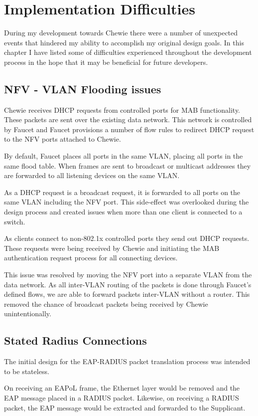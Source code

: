 \chapter{Implementation Difficulties}
During my development towards Chewie there were a number of unexpected events that hindered my ability to accomplish my original design goals. In this chapter I have listed some of difficulties experienced throughout the development process in the hope that it may be beneficial for future developers.

\section{NFV - VLAN Flooding issues}\label{section:nfv_flooding}
Chewie receives DHCP requests from controlled ports for MAB functionality. These packets are sent over the existing data network. This network is controlled by Faucet and Faucet provisions a number of flow rules to redirect DHCP request to the NFV ports attached to Chewie.

By default, Faucet places all ports in the same VLAN, placing all ports in the same flood table. When frames are sent to broadcast or multicast addresses they are forwarded to all listening devices on the same VLAN.

As a DHCP request is a broadcast request, it is forwarded to all ports on the same VLAN including the NFV port. This side-effect was overlooked during the design process and created issues when more than one client is connected to a switch.

As clients connect to non-802.1x controlled ports they send out DHCP requests. These requests were being received by Chewie and initiating the MAB authentication request process for all connecting devices. 

This issue was resolved by moving the NFV port into a separate VLAN from the data network. As all inter-VLAN routing of the packets is done through Faucet's defined flows, we are able to forward packets inter-VLAN without a router. This removed the chance of broadcast packets being received by Chewie unintentionally.

\section{Stated Radius Connections}
The initial design for the EAP-RADIUS packet translation process was intended to be stateless. 

On receiving an EAPoL frame, the Ethernet layer would be removed and the EAP message placed in a RADIUS packet. Likewise, on receiving a RADIUS packet, the EAP message would be extracted and forwarded to the Supplicant.

